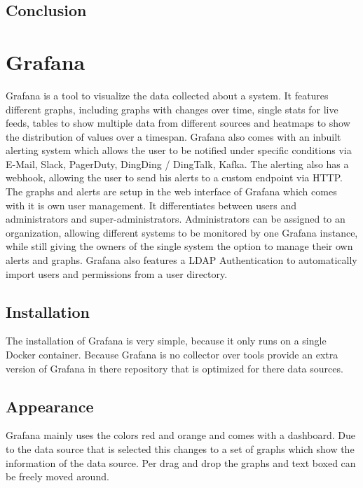 \subsection{Conclusion}


\section{Grafana}
\label{grafana} %
Grafana is a tool to visualize the data collected about a system. It features different graphs, including graphs with changes over time, single stats for live feeds, tables to show multiple data from different sources and heatmaps to show the distribution of values over a timespan.
Grafana also comes with an inbuilt alerting system which allows the user to be notified under specific conditions via E-Mail, Slack, PagerDuty, DingDing / DingTalk, Kafka. The alerting also has a webhook, allowing the user to send his alerts to a custom endpoint via HTTP.
The graphs and alerts are setup in the web interface of Grafana which comes with it is own user management. It differentiates between users and administrators and super-administrators. Administrators can be assigned to an organization, allowing different systems to be monitored by one Grafana instance, while still giving the owners of the single system the option to manage their own alerts and graphs.
Grafana also features a LDAP Authentication to automatically import users and permissions from a user directory.
\subsection{Installation}
The installation of Grafana is very simple, because it only runs on a single Docker container. Because Grafana is no collector over tools provide an extra version of Grafana in there repository that is optimized for there data sources.
\subsection{Appearance}%
Grafana mainly uses the colors red and orange and comes with a dashboard. Due to the data source that is selected this changes to a set of graphs which show the information of the data source. Per drag and drop the graphs and text boxed can be freely moved around. 
